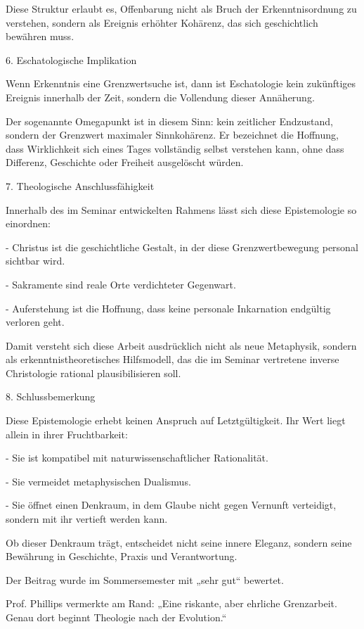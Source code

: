 \documentclass[
  ngerman,
]{article}
\begin{document}
Diese Struktur erlaubt es, Offenbarung nicht als Bruch der
Erkenntnisordnung zu verstehen, sondern als Ereignis erhöhter Kohärenz,
das sich geschichtlich bewähren muss.

6. Eschatologische Implikation

Wenn Erkenntnis eine Grenzwertsuche ist, dann ist Eschatologie kein
zukünftiges Ereignis innerhalb der Zeit, sondern die Vollendung dieser
Annäherung.

Der sogenannte Omegapunkt ist in diesem Sinn: kein zeitlicher
Endzustand, sondern der Grenzwert maximaler Sinnkohärenz. Er bezeichnet
die Hoffnung, dass Wirklichkeit sich eines Tages vollständig selbst
verstehen kann, ohne dass Differenz, Geschichte oder Freiheit
ausgelöscht würden.

7. Theologische Anschlussfähigkeit

Innerhalb des im Seminar entwickelten Rahmens lässt sich diese
Epistemologie so einordnen:

- Christus ist die geschichtliche Gestalt, in der diese
Grenzwertbewegung personal sichtbar wird.

- Sakramente sind reale Orte verdichteter Gegenwart.

- Auferstehung ist die Hoffnung, dass keine personale Inkarnation
endgültig verloren geht.

Damit versteht sich diese Arbeit ausdrücklich nicht als neue Metaphysik,
sondern als erkenntnistheoretisches Hilfsmodell, das die im Seminar
vertretene inverse Christologie rational plausibilisieren soll.

8. Schlussbemerkung

Diese Epistemologie erhebt keinen Anspruch auf Letztgültigkeit. Ihr Wert
liegt allein in ihrer Fruchtbarkeit:

- Sie ist kompatibel mit naturwissenschaftlicher Rationalität.

- Sie vermeidet metaphysischen Dualismus.

- Sie öffnet einen Denkraum, in dem Glaube nicht gegen Vernunft
verteidigt, sondern mit ihr vertieft werden kann.

Ob dieser Denkraum trägt, entscheidet nicht seine innere Eleganz,
sondern seine Bewährung in Geschichte, Praxis und Verantwortung.

Der Beitrag wurde im Sommersemester mit „sehr gut`` bewertet.

Prof. Phillips vermerkte am Rand: „Eine riskante, aber ehrliche
Grenzarbeit. Genau dort beginnt Theologie nach der Evolution.``
\end{document}

